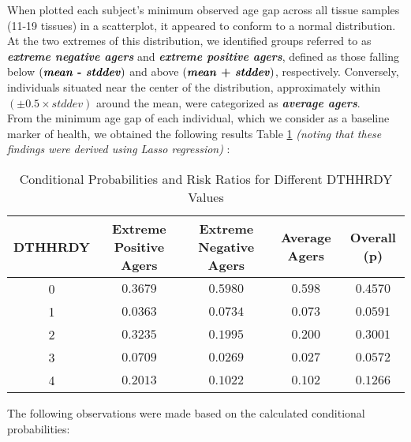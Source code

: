 \documentclass[twocolumn]{article}
\begin{document}
When plotted each subject's minimum observed age gap across all tissue samples (11-19 tissues) in a scatterplot, it appeared to conform to a normal distribution. At the two extremes of this distribution, we identified groups referred to as \textbf{\emph{extreme negative agers}} and \textbf{\emph{extreme positive agers}}, defined as those falling below $(\textbf{\textit{mean} - \textit{stddev}})$ and above $(\textbf{\textit{mean} + \textit{stddev}})$, respectively. Conversely, individuals situated near the center of the distribution, approximately within $(\pm 0.5 \times \textit{stddev})$ around the mean, were categorized as \textbf{\emph{average agers}}.\\

From the minimum age gap of each individual, which we consider as a baseline marker of health, we obtained the following results Table \ref{tab:conditional_probabilities_of_DTHHRDY} \textit{(noting that these findings were derived using Lasso regression)} :\\

\begin{table}[h!]
    \centering
    \caption{Conditional Probabilities and Risk Ratios for Different DTHHRDY Values}
    \begin{tabular}{|c|c|c|c|c|}
        \hline
       \textbf{DTHHRDY} & \textbf{Extreme Positive Agers} & \textbf{Extreme Negative Agers} & \textbf{Average Agers} & \textbf{Overall} (p) \\
        \hline
        0 & $0.3679$ & $0.5980$ & $0.598$ & $0.4570$ \\
        \hline
        1 & $0.0363$ & $0.0734$ & $0.073$ & $0.0591$ \\
        \hline
        2 & $0.3235$ & $0.1995$ & $0.200$ & $0.3001$ \\
        \hline
        3 & $0.0709$ & $0.0269$ & $0.027$ & $0.0572$ \\
        \hline
        4 & $0.2013$ & $0.1022$ & $0.102$ & $0.1266$ \\
        \hline
    \end{tabular}
    \label{tab:conditional_probabilities_of_DTHHRDY}
\end{table}

\noindent The following observations were made based on the calculated conditional probabilities:
\end{document}
